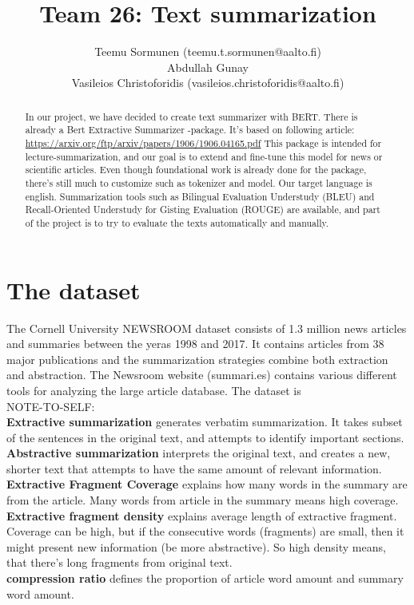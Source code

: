 \documentclass{article}
\title{Team 26: Text summarization}
\author{Teemu Sormunen (teemu.t.sormunen@aalto.fi)\\
	Abdullah Gunay\\
	Vasileios Christoforidis (vasileios.christoforidis@aalto.fi)\\
}
\begin{document}
	
\maketitle

\begin{abstract}
\noindent
	In our project, we have decided to create text summarizer with BERT. 
	There is already a Bert Extractive Summarizer -package. It's based on following article: \href{https://arxiv.org/ftp/arxiv/papers/1906/1906.04165.pdf}{https://arxiv.org/ftp/arxiv/papers/1906/1906.04165.pdf}
	This package is intended for lecture-summarization, and our goal is to extend and fine-tune this model for news or scientific articles.
	Even though foundational work is already done for the package, there's still much to customize such as tokenizer and model. 
	Our target language is english. Summarization tools such as Bilingual Evaluation Understudy (BLEU) and Recall-Oriented Understudy for Gisting Evaluation (ROUGE) are available, and part of the project is to try to evaluate the texts automatically and manually.	
\end{abstract}

\clearpage
\section{The dataset}

The Cornell University NEWSROOM dataset \cite{dataset} consists of 1.3 million news articles and summaries between the yeras 1998 and 2017. It contains articles from 38 major publications and the summarization strategies combine both extraction and abstraction. The Newsroom website (summari.es) contains various different tools for analyzing the large article database. The dataset is \\

\noindent
NOTE-TO-SELF: \\
\textbf{Extractive summarization} generates verbatim summarization. It takes subset of the sentences in the original text, and attempts to identify important sections. \cite{dataset}\\
\textbf{Abstractive summarization} interprets the original text, and creates a new, shorter text that attempts to have the same amount of relevant information.\\
\textbf{Extractive Fragment Coverage} explains how many words in the summary are from the article. Many words from article in the summary means high coverage.\\
\textbf{Extractive fragment density} explains average length of extractive fragment. Coverage can be high, but if the consecutive words (fragments) are small, then it might present new information (be more abstractive). So high density means, that there's long fragments from original text.\\
\textbf{compression ratio} defines the proportion of article word amount and summary word amount. \\
\end{document}
